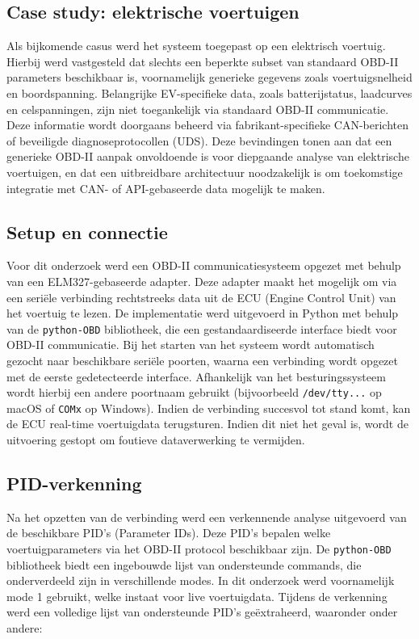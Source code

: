 \subsection{Case study: elektrische voertuigen}

Als bijkomende casus werd het systeem toegepast op een elektrisch voertuig. Hierbij werd vastgesteld dat slechts een beperkte subset van standaard OBD-II parameters beschikbaar is, voornamelijk generieke gegevens zoals voertuigsnelheid en boordspanning.
Belangrijke EV-specifieke data, zoals batterijstatus, laadcurves en celspanningen, zijn niet toegankelijk via standaard OBD-II communicatie. Deze informatie wordt doorgaans beheerd via fabrikant-specifieke CAN-berichten of beveiligde diagnoseprotocollen (UDS).
Deze bevindingen tonen aan dat een generieke OBD-II aanpak onvoldoende is voor diepgaande analyse van elektrische voertuigen, en dat een uitbreidbare architectuur noodzakelijk is om toekomstige integratie met CAN- of API-gebaseerde data mogelijk te maken.

\subsection{Setup en connectie}
Voor dit onderzoek werd een OBD-II communicatiesysteem opgezet met behulp van een ELM327-gebaseerde adapter. Deze adapter maakt het mogelijk om via een seriële verbinding rechtstreeks data uit de ECU (Engine Control Unit) van het voertuig te lezen.
De implementatie werd uitgevoerd in Python met behulp van de \texttt{python-OBD} bibliotheek, die een gestandaardiseerde interface biedt voor OBD-II communicatie. Bij het starten van het systeem wordt automatisch gezocht naar beschikbare seriële poorten, waarna een verbinding wordt opgezet met de eerste gedetecteerde interface.
Afhankelijk van het besturingssysteem wordt hierbij een andere poortnaam gebruikt (bijvoorbeeld \texttt{/dev/tty...} op macOS of \texttt{COMx} op Windows). Indien de verbinding succesvol tot stand komt, kan de ECU real-time voertuigdata terugsturen. Indien dit niet het geval is, wordt de uitvoering gestopt om foutieve dataverwerking te vermijden.

\subsection{PID-verkenning}
Na het opzetten van de verbinding werd een verkennende analyse uitgevoerd van de beschikbare PID’s (Parameter IDs). Deze PID’s bepalen welke voertuigparameters via het OBD-II protocol beschikbaar zijn.
De \texttt{python-OBD} bibliotheek biedt een ingebouwde lijst van ondersteunde commands, die onderverdeeld zijn in verschillende modes. In dit onderzoek werd voornamelijk mode 1 gebruikt, welke instaat voor live voertuigdata.
Tijdens de verkenning werd een volledige lijst van ondersteunde PID’s geëxtraheerd, waaronder onder andere:

